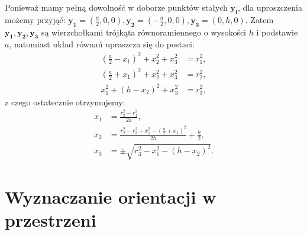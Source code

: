Ponieważ mamy pełną dowolność w doborze punktów stałych $\boldsymbol{y_i}$, dla uproszczenia możemy przyjąć:
$\boldsymbol{y_1}=(\frac{a}{2},0,0), \boldsymbol{y_2}=(-\frac{a}{2},0,0), \boldsymbol{y_3}=(0,h,0)$. 
Zatem $\boldsymbol{y_1}, \boldsymbol{y_2}, \boldsymbol{y_3}$ są wierzchołkami
trójkąta równoramiennego o wysokości $h$ i podstawie $a$, natomiast układ równań upraszcza
się do postaci:
 \begin{align}
    \nonumber  (\frac{a}{2}-x_1)^2 + x_2^2 + x_3^2 &= r_1^2,
 \\ \nonumber  (\frac{a}{2}+x_1)^2 + x_2^2 + x_3^2 &= r_2^2,
 \\ \nonumber  x_1^2 + (h-x_2)^2 + x_3^2 &= r_3^2,
 \end{align}
z czego ostatecznie otrzymujemy:
 \begin{align}
    \nonumber  x_1 &= \frac{r_2^2 - r_1^2}{2a},
 \\ \nonumber  x_2 &= \frac{r_2^2 - r_3^2 + x_1^2 - (\frac{a}{2}+x_1)^2}{2h}  + \frac{h}{2},
 \\ \nonumber  x_3 &= \pm \sqrt{r_3^2-x_1^2-(h-x_2)^2}.
 \end{align}


\section{Wyznaczanie orientacji w przestrzeni}

